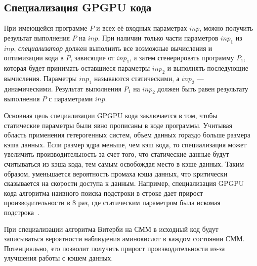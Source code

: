 \subsection{Специализация GPGPU кода}
При имеющейся программе $P$ и всех её входных параметрах $inp$, можно получить 
результат выполнения $P$ на $inp$.
При наличии только части параметров $inp_1$ из $inp$, \emph{специализатор} 
должен выполнить все возможные вычисления и оптимизации кода в $P$, зависящие 
от $inp_1$, а затем сгенерировать программу $P_1$, которая будет принимать 
оставшиеся параметры $inp_2$ и выполнять последующие вычисления.
Параметры $inp_1$ называются статическими, а $inp_2$ --- динамическими.
Результат выполнения $P_1$ на $inp_2$ должен быть равен результату выполнения 
$P$ с параметрами $inp$.

Основная цель специализации GPGPU кода заключается в том, чтобы статические 
параметры были явно прописаны в коде программы.
Учитывая область применения гетерогенных систем, объем данных гораздо 
больше размера кэша данных.
Если размер ядра меньше, чем кэш кода, то специализация может увеличить 
производительность за счет того, что статические данные будут считываться из 
кэша кода, тем самым освобождая место в кэше данных.
Таким образом, уменьшается вероятность промаха кэша данных, что критически 
сказывается на скорости доступа к данным.
Например, специализация GPGPU кода алгоритма наивного поиска подстроки в строке 
дает прирост производительности в 8 раз, где статическим 
параметром была искомая подстрока~\cite{part_eval_GPU}.

При специализации алгоритма Витерби на СММ в исходный код будут записываться 
вероятности наблюдения аминокислот в каждом состоянии СММ.
Потенциально, это позволит получить прирост производительности из-за
улучшения работы с кэшем данных.
